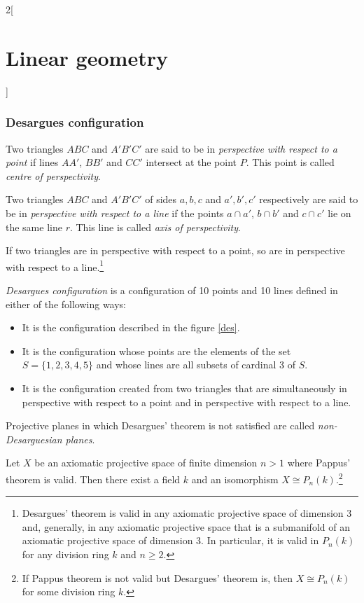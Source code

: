 \documentclass[class=article,10pt,crop=false]{standalone}
\begin{document}
\begin{multicols}{2}[\section{Linear geometry}]
\subsubsection{Desargues configuration}
\begin{definition}
Two triangles $ABC$ and $A'B'C'$ are said to be in \textit{perspective with respect to a point} if lines $AA'$, $BB'$ and $CC'$ intersect at the point $P$. This point is called \textit{centre of perspectivity}.
\end{definition}
\begin{definition}
Two triangles $ABC$ and $A'B'C'$ of sides $a,b,c$ and $a',b',c'$ respectively are said to be in \textit{perspective with respect to a line} if the points $a\cap a'$, $b\cap b'$ and $c\cap c'$ lie on the same line $r$. This line is called \textit{axis of perspectivity}.
\end{definition}
\begin{theorem}
If two triangles are in perspective with respect to a point, so are in perspective with respect to a line.\footnote{Desargues' theorem is valid in any axiomatic projective space of dimension 3 and, generally, in any axiomatic projective space that is a submanifold of an axiomatic projective space of dimension 3. In particular, it is valid in $P_n(k)$ for any division ring $k$ and $n\geq2$.}
\end{theorem}
\begin{definition}
\textit{Desargues configuration} is a configuration of 10 points and 10 lines defined in either of the following ways:
\begin{itemize}
    \item It is the configuration described in the figure \ref{des}.
    \begin{figure}[ht] 
        \centering 
    \end{figure}
    \item It is the configuration whose points are the elements of the set $S=\{1,2,3,4,5\}$ and whose lines are all subsets of cardinal 3 of $S$.
    \item It is the configuration created from two triangles that are simultaneously in perspective with respect to a point and in perspective with respect to a line. 
\end{itemize}
\end{definition}
\begin{definition}
Projective planes in which Desargues' theorem is not satisfied are called \textit{non-Desarguesian planes}.
\end{definition}
\begin{theorem}
Let $X$ be an axiomatic projective space of finite dimension $n>1$ where Pappus' theorem is valid. Then there exist a field $k$ and an isomorphism $X\cong P_n(k)$.\footnote{If Pappus theorem is not valid but Desargues' theorem is, then $X\cong P_n(k)$ for some division ring $k$.}
\end{theorem}

\end{multicols}
\end{document}
